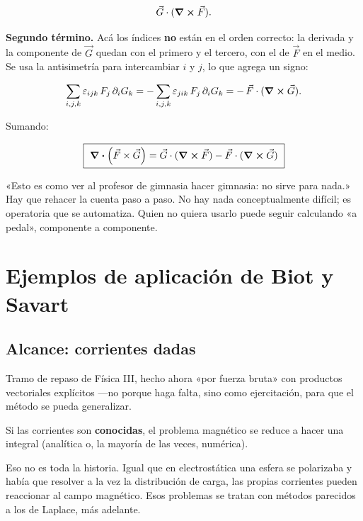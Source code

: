 \documentclass[12pt,a4paper]{article}
\begin{document}
\[
\vec G\cdot(\curl \vec F).
\]

\textbf{Segundo término.} Acá los índices \textbf{no} están en el orden correcto: la
derivada y la componente de $\vec G$ quedan con el primero y el tercero, con el
de $\vec F$ en el medio. Se usa la antisimetría para intercambiar $i$ y $j$, lo
que agrega un signo:

\[
\sum_{i,j,k}\varepsilon_{ijk}\,F_j\,\partial_i G_k
= -\sum_{i,j,k}\varepsilon_{jik}\,F_j\,\partial_i G_k
= -\,\vec F\cdot(\curl \vec G).
\]

Sumando:

\begin{keybox}
\[
\boxed{\ \div (\vec F\times\vec G)
= \vec G\cdot(\curl \vec F) - \vec F\cdot(\curl \vec G)\ }
\]
\end{keybox}

\begin{notebox}
«Esto es como ver al profesor de gimnasia hacer
gimnasia: no sirve para nada.» Hay que rehacer la cuenta paso a paso. No hay
nada conceptualmente difícil; es operatoria que se automatiza. Quien no
quiera usarlo puede seguir calculando «a pedal», componente a componente.
\end{notebox}

\section{Ejemplos de aplicación de Biot y Savart}

\subsection{Alcance: corrientes dadas}

Tramo de repaso de Física III, hecho ahora «por fuerza bruta» con productos
vectoriales explícitos ---no porque haga falta, sino como ejercitación, para que
el método se pueda generalizar.

Si las corrientes son \textbf{conocidas}, el problema magnético se reduce a hacer una
integral (analítica o, la mayoría de las veces, numérica).

\begin{notebox}
Eso no es toda la historia. Igual que en electrostática una esfera se
polarizaba y había que resolver a la vez la distribución de carga, las
propias corrientes pueden reaccionar al campo magnético. Esos problemas se
tratan con métodos parecidos a los de Laplace, más adelante.
\end{notebox}
\end{document}
